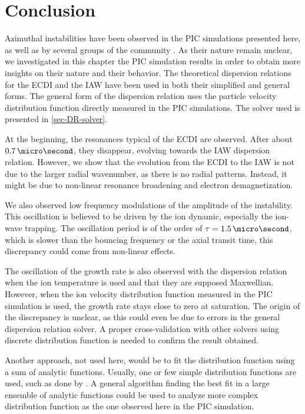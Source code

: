 
\section{Conclusion}
  Azimuthal instabilities have been observed in the \ac{PIC} simulations presented here, as well as by several groups of the community \citep{hara2019a,janhunen2018,taccogna2019}.
  As their nature remain unclear, we investigated in this chapter the \ac{PIC} simulation results in order to obtain more insights on their nature and their behavior.
  The theoretical dispersion relations for the \ac{ECDI} and the \ac{IAW} have been used in both their simplified and general forms.
  The general form of the dispersion relation uses the particle velocity distribution function directly measured in the \ac{PIC} simulations.
  The solver used is presented in \cref{sec-DR-solver}.
  
  At the beginning, the resonances typical of the \ac{ECDI} are observed.
  After about $0.7\,\micro\second$, they disappear, evolving towards the \ac{IAW} dispersion relation.
    However, we show that the evolution from the \ac{ECDI} to the \ac{IAW}  is not due to the larger radial wavenumber, as there is no radial patterns.
  Instead, it might be due to non-linear resonance broadening and electron demagnetization.
  
  \vspace{1ex}
  We also observed low frequency modulations of the amplitude of the instability.
  This oscillation is believed to be driven by the ion dynamic, especially the ion-wave trapping.
  The oscillation period is of the order of $\tau=1.5\,\micro\second$, which is slower than the bouncing frequency or the axial transit time, this discrepancy could come from non-linear effects.
  
  The oscillation of the growth rate is also observed with the dispersion relation when the ion temperature is used and that they are supposed Maxwellian.
  However, when the ion velocity distribution function measured in the \ac{PIC}  simulation is used, the growth rate stays close to zero at saturation.
  The origin of the discrepancy is unclear, as this could even be due to errors in the general dispersion relation solver.
  A proper cross-validation with other solvers using discrete distribution function is needed to confirm the result obtained.
  
  Another approach, not used here, would be to fit the distribution function using a sum of analytic functions.
  Usually, one or few simple distribution functions are used, such as done by \citet{ronnmark1982}.
  A general algorithm finding the best fit in a large ensemble of analytic functions could be used to analyze more complex distribution function as the one observed here in the PIC simulation.


